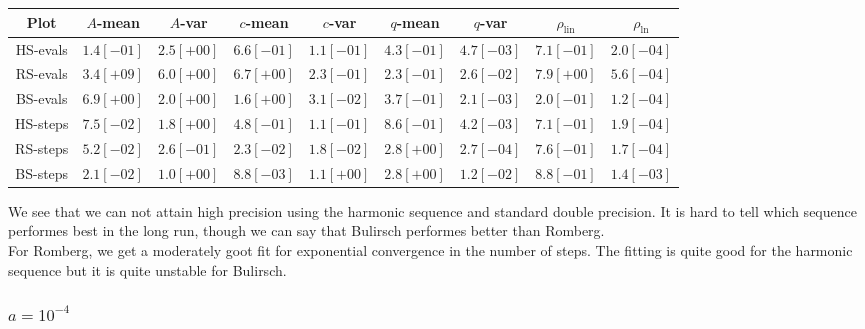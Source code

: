 \begin{table}[H]
    \centering
    \small
    \begin{tabular}{c||c|c|c|c|c|c|c|c}
Plot & \(A\)-mean & \(A\)-var & \(c\)-mean & \(c\)-var & \(q\)-mean & \(q\)-var & \(\rho_{\operatorname{lin}}\) & \(\rho_{\ln}\)\\\hline
\rowcolor{yellow}
HS-evals & \(1.4[-01]\) & \(2.5[+00]\) & \(6.6[-01]\) & \(1.1[-01]\) & \(4.3[-01]\) & \(4.7[-03]\) & \(7.1[-01]\) & \(2.0[-04]\) \\
\rowcolor{red}
RS-evals & \(3.4[+09]\) & \(6.0[+00]\) & \(6.7[+00]\) & \(2.3[-01]\) & \(2.3[-01]\) & \(2.6[-02]\) & \(7.9[+00]\) & \(5.6[-04]\) \\
\rowcolor{yellow}
BS-evals & \(6.9[+00]\) & \(2.0[+00]\) & \(1.6[+00]\) & \(3.1[-02]\) & \(3.7[-01]\) & \(2.1[-03]\) & \(2.0[-01]\) & \(1.2[-04]\) \\
\rowcolor{yellow}
HS-steps & \(7.5[-02]\) & \(1.8[+00]\) & \(4.8[-01]\) & \(1.1[-01]\) & \(8.6[-01]\) & \(4.2[-03]\) & \(7.1[-01]\) & \(1.9[-04]\) \\
\rowcolor{yellow}
RS-steps & \(5.2[-02]\) & \(2.6[-01]\) & \(2.3[-02]\) & \(1.8[-02]\) & \(2.8[+00]\) & \(2.7[-04]\) & \(7.6[-01]\) & \(1.7[-04]\) \\
\rowcolor{red}
BS-steps & \(2.1[-02]\) & \(1.0[+00]\) & \(8.8[-03]\) & \(1.1[+00]\) & \(2.8[+00]\) & \(1.2[-02]\) & \(8.8[-01]\) & \(1.4[-03]\) \\
    \end{tabular}
    \label{tab:my_label}
\end{table}

We see that we can not attain high precision using the harmonic sequence and standard double precision. It is hard to tell which sequence performes best in the long run, though we can say that Bulirsch performes better than Romberg.\\

For Romberg, we get a moderately goot fit for exponential convergence in the number of steps. The fitting is quite good for the harmonic sequence but it is quite unstable for Bulirsch.

\subsubsection{\(a = 10^{-4}\)}


